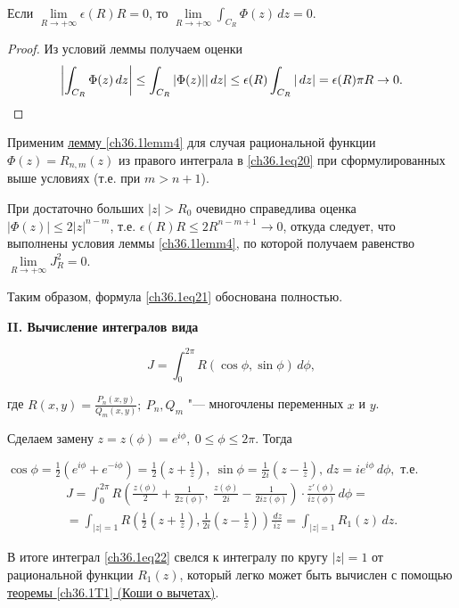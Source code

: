 \begin{leftbar}
\begin{lemm}
Если $\lim\limits_{R \to +\infty} \epsilon(R)R = 0$, то $\lim\limits_{R \to +\infty} \int_{C_R} \Phi(z)\,dz = 0$.
\end{lemm}

\begin{proof}
Из условий леммы получаем оценки
$$
\left| \int_{C_R} \Phi(z)\,dz \right| \le \int_{C_R} |\Phi(z)||\,dz| \le \epsilon(R) \int_{C_R}|\,dz| = \epsilon(R)\pi R \to 0. \qedhere
$$
\end{proof}

Применим \hyperref[ch36.1lemm4]{лемму \ref{ch36.1lemm4}} для случая рациональной функции $\Phi(z) = R_{n,m}(z)$ из правого интеграла в \eqref{ch36.1eq20} при сформулированных выше условиях (т.е. при $m > n + 1$).

При достаточно больших $|z| > R_0$ очевидно справедлива оценка $|\Phi(z)| \le 2|z|^{n - m}$, т.е.
$\epsilon(R)R \le 2R^{n - m + 1} \to 0$, откуда следует, что выполнены условия леммы \ref{ch36.1lemm4}, по которой получаем равенство $\lim\limits_{R \to +\infty} J_R^2 = 0$.

Таким образом, формула \eqref{ch36.1eq21} обоснована полностью.

{\bf II. Вычисление интегралов вида}

\begin{equation} \label{ch36.1eq22}
J = \int_{0}^{2\pi} R(\cos \phi, \sin\phi)\,d\phi,
\end{equation}

где $R(x,y) = \frac{P_n(x,y)}{Q_m(x,y)}; \: P_n, Q_m$ "--- многочлены переменных $x$ и $y$.

Сделаем замену $z = z(\phi) = e^{i \phi}, \: 0 \le \phi \le 2\pi$. Тогда 

$\cos\phi = \frac{1}{2} (e^{i\phi} + e^{-i\phi}) = \frac{1}{2}\left( z + \frac{1}{z}\right), \: \sin\phi = \frac{1}{2i} \left(z - \frac{1}{z} \right), \,dz = i e^{i \phi} \,d\phi,$ т.е. 
\begin{multline*}
J = \int_0^{2\pi} R\left( \frac{z(\phi)}{2} + \frac{1}{2z(\phi)}, \: \frac{z(\phi)}{2i} - \frac{1}{2iz(\phi)}\right) \cdot \frac{z'(\phi)}{iz(\phi)} \,d\phi =\\= \int_{|z| = 1} R\left( \frac{1}{2} \left( z + \frac{1}{z}\right), \frac{1}{2i}\left( z - \frac{1}{z}\right)\right)\frac{\,dz}{iz} = \int_{|z| = 1} R_1(z)\,dz.
\end{multline*}

В итоге интеграл \eqref{ch36.1eq22} свелся к интегралу по кругу $|z| = 1$ от рациональной функции $R_1(z)$, который легко может быть вычислен с помощью  \hyperref[ch36.1T1]{теоремы \ref{ch36.1T1} (Коши о вычетах)}.


\end{leftbar}
